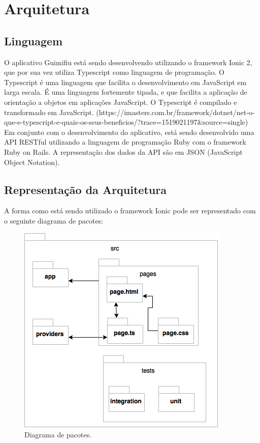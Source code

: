 \section{Arquitetura}

\subsection{Linguagem}

O aplicativo Guimifiu está sendo desenvolvendo utilizando o framework Ionic 2, que por sua vez utiliza Typescript como linguagem de programação. O Typescript é uma linguagem que facilita o desenvolvimento em JavaScript em larga escala. É uma linguagem fortemente tipada, e que facilita a aplicação de orientação a objetos em aplicações JavaScript. O Typescript é compilado e transformado em JavaScript.
(https://imasters.com.br/framework/dotnet/net-o-que-e-typescript-e-quais-os-seus-beneficios/?trace=1519021197&source=single)
Em conjunto com o desenvolvimento do aplicativo, está sendo desenvolvido uma API RESTful utilizando a linguagem de programação Ruby com o framework Ruby on Rails. A representação dos dados da API são em JSON (JavaScript Object Notation).


\subsection{Representação da Arquitetura}

A forma como está sendo utilizado o framework Ionic pode ser representado com o seguinte diagrama de pacotes:

\begin{figure}[H]
    \centering
    \includegraphics[scale=0.5]{figuras/ionic_arch.png}
    \caption[Diagrama de pacotes do aplicativo]{Diagrama de pacotes.}
    \label{img:pacotes}
\end{figure}

